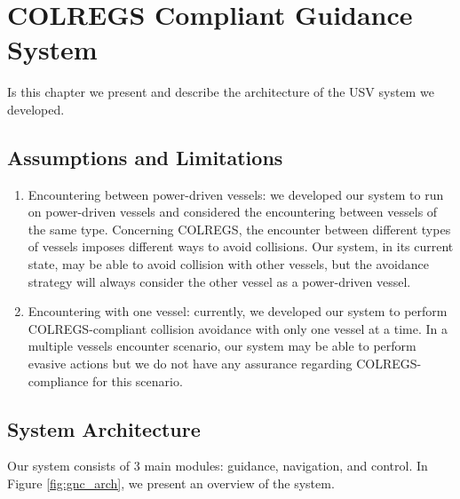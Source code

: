 \chapter{COLREGS Compliant Guidance System}
\label{chap:4_COLREGS_Compliant_Guidance_System}

    Is this chapter we present and describe the architecture of the \ac{USV} system we developed.

\section{Assumptions and Limitations}

    \begin{enumerate}
        
        \item Encountering between power-driven vessels: we developed our system to run on power-driven vessels and considered the encountering between vessels of the same type. Concerning COLREGS, the encounter between different types of vessels imposes different ways to avoid collisions. Our system, in its current state, may be able to avoid collision with other vessels, but the avoidance strategy will always consider the other vessel as a power-driven vessel.

        \item Encountering with one vessel: currently, we developed our system to perform COLREGS-compliant collision avoidance with only one vessel at a time. In a multiple vessels encounter scenario, our system may be able to perform evasive actions but we do not have any assurance regarding COLREGS-compliance for this scenario.

    \end{enumerate}

\section{System Architecture}

    Our system consists of 3 main modules: guidance, navigation, and control. In Figure \ref{fig:gnc_arch}, we present an overview of the system.

